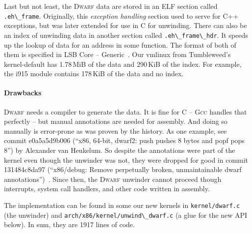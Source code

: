 \documentclass[10pt]{llncs}
\newcommand{\code}[2][]{\lstinline[columns=fullflexible, #1]$#2$}
\newcommand{\file}[2][]{\code[language={}, #1]{#2}}
\newcommand{\commit}[1][]{\texttt{#1}}
\newcommand{\dwarf}{\textsc{Dwarf}\xspace}
\newcommand{\gcc}{\textsc{Gcc}\xspace}
\begin{document}
Last but not least, the \dwarf data are stored in an ELF section called
\code{.eh\_frame}. Originally, this \textit{exception handling} section used
to serve for C++ exceptions, but was later extended for use in C for
unwinding.  There can also be an index of unwinding data in another section
called \code{.eh\_frame\_hdr}.  It speeds up the lookup of data for an address
in some function. The format of both of them is specified in LSB Core --
Generic~\cite{LSB_generic}. Our vmlinux from Tumbleweed's kernel-default has
1.78\,MiB of the data and 290\,KiB of the index. For example, the i915 module
contains 178\,KiB of the data and no index.

\paragraph{Drawbacks} \dwarf needs a compiler to generate the data. It is fine
for C -- \gcc handles that perfectly -- but manual annotations are needed for
assembly. And doing so manually is error-prone as was proven by the history.
As one example, see commit \commit{e0a5a5d9b006} (``x86, 64-bit, dwarf2: push
pushes 8 bytes and popf pops 8'') by Alexander van Heukelum. So despite the
annotations were part of the kernel even though the unwinder was not, they
were dropped for good in commit \commit{131484c8da97} (``x86/debug: Remove
perpetually broken, unmaintainable dwarf
annotations'')~\cite{git_dwarfinfo_upstream_rm}.  Since then, the \dwarf
unwinder cannot proceed though interrupts, system call handlers, and other
code written in assembly.

The implementation can be found in some our new kernels in
\file{kernel/dwarf.c} (the unwinder) and
\file{arch/x86/kernel/unwind\_dwarf.c} (a glue for the new API below). In sum,
they are 1917 lines of code.
\end{document}
